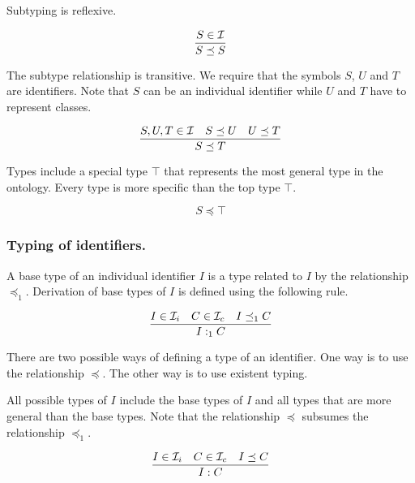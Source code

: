 \documentclass[runningheads]{llncs}
\newcommand{\I}{{\cal I}}
\newcommand{\Ii}{{\cal I}_i}
\newcommand{\Ic}{{\cal I}_c}
\begin{document}
\noindent Subtyping is reflexive.

\begin{equation}
\dfrac{S\in \I}
      {S\preceq\/S}
\end{equation}

\noindent The subtype relationship is transitive. We require that the
symbols $S$, $U$ and $T$ are identifiers. Note that $S$ can be an
individual identifier while $U$ and $T$ have to represent
classes.

\begin{equation}
\dfrac{S,U,T\in\I \quad S\preceq\/U \quad U\preceq\/T}
      {S\preceq\/T}   
\end{equation}

\noindent Types include a special type $\top$ that represents the most
general type in the ontology. Every type is more specific than the top
type $\top$.

\begin{equation}
S\preceq\top
\end{equation}


\subsubsection{Typing of identifiers.}

\noindent A base type of an individual identifier $I$ is a type
related to $I$ by the relationship $\preceq_1$. Derivation of base
types of $I$ is defined using the following rule.

\begin{equation}
\dfrac{I\in\Ii \quad C\in\Ic \quad I\preceq_1\/C}
      {I:_1C}
\end{equation}

\noindent There are two possible ways of defining a type of an
identifier. One way is to use the relationship $\preceq$. The other
way is to use existent typing.

All possible types of $I$ include the base types of $I$ and all
types that are more general than the base types. Note that the
relationship $\preceq$ subsumes the relationship $\preceq_1$.


\begin{equation}
\dfrac{I\in\Ii \quad C\in\Ic\quad I\preceq\/C}
      {I:C}   
\end{equation}
\end{document}
